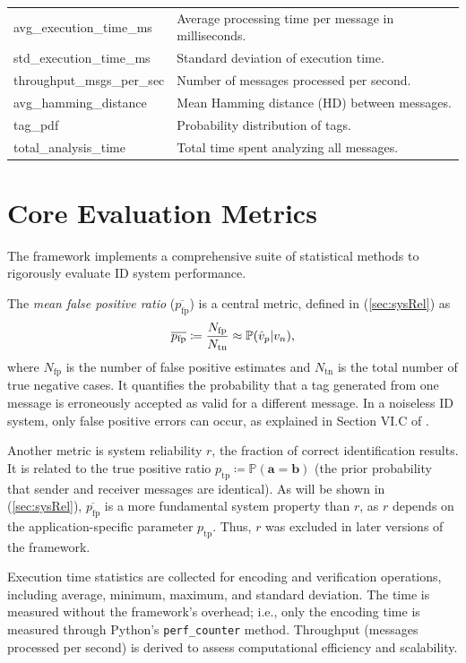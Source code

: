 \documentclass[english,BCOR=4mm,cdfont=false]{tudscrreprt} %
\begin{document}
\begin{longtable}{@{} p{} p{} @{}}
\quad avg\_execution\_time\_ms & Average processing time per message in milliseconds. \\
\quad std\_execution\_time\_ms & Standard deviation of execution time. \\
\quad throughput\_msgs\_per\_sec & Number of messages processed per second. \\
\quad avg\_hamming\_distance & Mean Hamming distance (HD) between messages. \\
\quad tag\_pdf & Probability distribution of tags. \\
\quad total\_analysis\_time & Total time spent analyzing all messages. \\
\end{longtable}


\section{Core Evaluation Metrics}
\label{sec:metrics_methods}
The framework implements a comprehensive suite of statistical methods to rigorously evaluate ID system performance.

The \emph{mean false positive ratio} ($\overline{p_\text{fp}}$) is a central metric, defined in (\ref{sec:sysRel}) as
\begin{equation}
\overline{p_\text{fp}} \coloneq \frac{N_\text{fp}}{N_\text{tn}} \approx \mathbb{P}(\hat{v}_p | v_n),
\end{equation}
where $N_\text{fp}$ is the number of false positive estimates and $N_\text{tn}$ is the total number of true negative cases. It quantifies the probability that a tag generated from one message is erroneously accepted as valid for a different message. In a noiseless ID system, only false positive errors can occur, as explained in Section VI.C of \cite{Codes_for_ID_Tutorial}.

Another metric is system reliability $r$, the fraction of correct identification results. It is related to the true positive ratio $p_\text{tp} \coloneq \mathbb{P}(\boldsymbol{a} = \boldsymbol{b})$ (the prior probability that sender and receiver messages are identical). As will be shown in (\ref{sec:sysRel}), $\overline{p_\text{fp}}$ is a more fundamental system property than $r$, as $r$ depends on the application-specific parameter $p_\text{tp}$. Thus, $r$ was excluded in later versions of the framework.

Execution time statistics are collected for encoding and verification operations, including average, minimum, maximum, and standard deviation. The time is measured without the framework's overhead; i.e., only the encoding time is measured through Python's \texttt{perf\_counter} method. Throughput (messages processed per second) is derived to assess computational efficiency and scalability.
\end{document}

